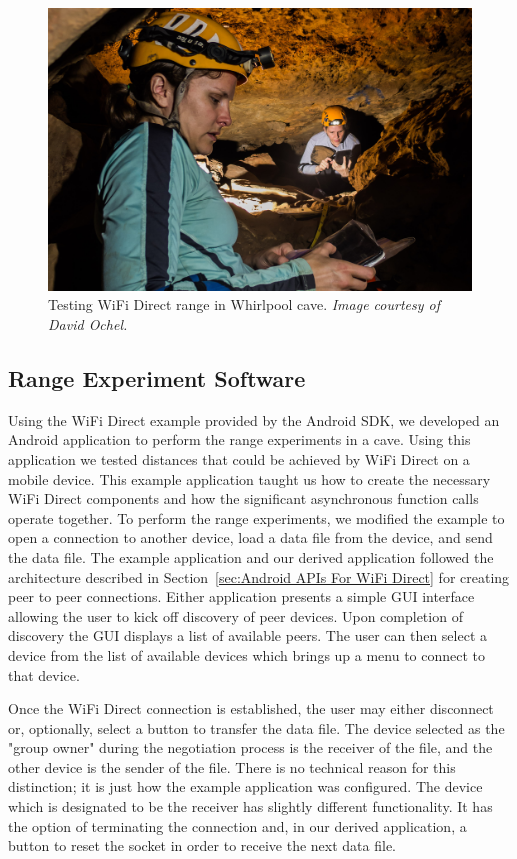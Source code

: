 \documentclass[10pt,twocolumn]{article}
\begin{document}
\begin{figure}
\includegraphics[width=\columnwidth]{cavewifi}
\caption{Testing WiFi Direct range in Whirlpool cave. \textit{Image courtesy of David Ochel.}}
\end{figure}


\subsection{Range Experiment Software}
\label{sec:Range Experiment Software}
Using the WiFi Direct example provided by the Android SDK, 
we developed an Android application to perform the range experiments in a cave.
Using this application we tested distances that could be achieved by WiFi Direct on a mobile device.
This example application taught us how to create the necessary WiFi Direct components and how the significant asynchronous function calls operate together.
To perform the range experiments, we modified the example to open a connection to another device, load a data file from the device, and send the data file. 
The example application and our derived application followed the architecture described in Section~\ref{sec:Android APIs For WiFi Direct} for creating peer to peer connections. 
Either application presents a simple GUI interface allowing the user to kick off discovery of peer devices. 
Upon completion of discovery the GUI displays a list of available peers.
The user can then select a device from the list of available devices which brings up a menu to connect to that device.

Once the WiFi Direct connection is established, the user may either disconnect or, optionally, select a button to transfer the data file.
The device selected as the "group owner" during the negotiation process is the receiver of the file, and the other device is the sender of the file.
There is no technical reason for this distinction; it is just how the example application was configured.
The device which is designated to be the receiver has slightly different functionality.
It has the option of terminating the connection and, in our derived application, a button to reset the socket in order to receive the next data file.
\end{document}

